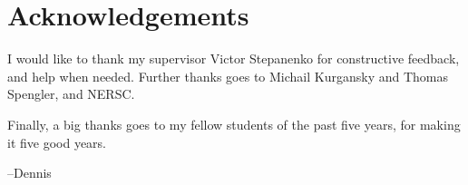 \chapter*{Acknowledgements}

I would like to thank my supervisor Victor Stepanenko for constructive feedback, and help when needed.
Further thanks goes to Michail Kurgansky and Thomas Spengler, and NERSC.

Finally, a big thanks goes to my fellow students of the past five years, for making it five good years.

\medskip\hfill --Dennis
